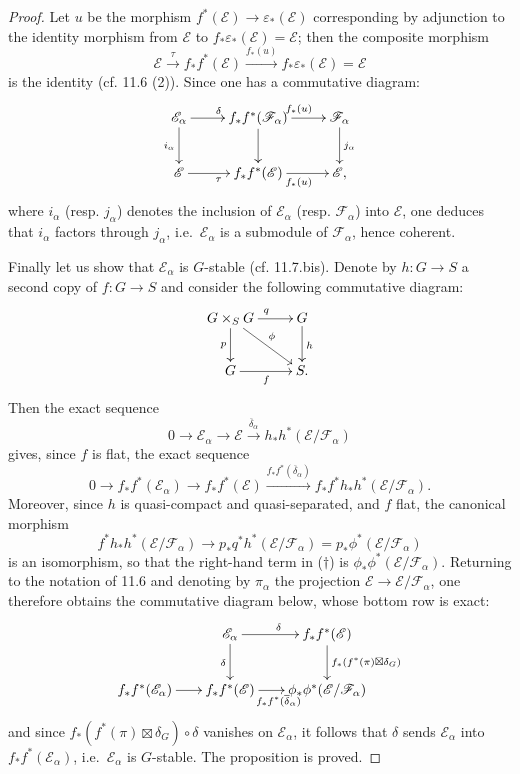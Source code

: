 \begin{proof}
Let $u$ be the morphism $f^*(\mathscr E)\to\varepsilon_*(\mathscr E)$ corresponding by adjunction to the identity morphism from $\mathscr E$ to $f_*\varepsilon_*(\mathscr E)=\mathscr E$; then the composite morphism
\[
\mathscr E\xrightarrow{\tau}f_*f^*(\mathscr E)\xrightarrow{f_*(u)}f_*\varepsilon_*(\mathscr E)=\mathscr E
\]
is the identity (cf. 11.6 (2)). Since one has a commutative diagram:
\[
\xymatrix{\mathscr E_\alpha\ar[r]^\delta\ar[d]_{i_\alpha}&f_*f^*(\mathscr F_\alpha)\ar[r]^{f_*(u)}\ar[d]&\mathscr F_\alpha\ar[d]^{j_\alpha}\\\mathscr E\ar[r]_\tau&f_*f^*(\mathscr E)\ar[r]_{f_*(u)}&\mathscr E,}
\]
where $i_\alpha$ (resp. $j_\alpha$) denotes the inclusion of $\mathscr E_\alpha$ (resp. $\mathscr F_\alpha$) into $\mathscr E$, one deduces that $i_\alpha$ factors through $j_\alpha$, i.e.\ $\mathscr E_\alpha$ is a submodule of $\mathscr F_\alpha$, hence coherent.

Finally let us show that $\mathscr E_\alpha$ is $G$-stable (cf. 11.7.bis). Denote by $h:G\to S$ a second copy of $f:G\to S$ and consider the following commutative diagram:
\[
\xymatrix{G\times_S G\ar[r]^q\ar[d]_p\ar[dr]^\phi&G\ar[d]^h\\G\ar[r]_f&S.}
\]
Then the exact sequence
\[
0\to\mathscr E_\alpha\to\mathscr E\xrightarrow{\overline\delta_\alpha}h_*h^*(\mathscr E/\mathscr F_\alpha)
\]
gives, since $f$ is flat, the exact sequence
\begin{equation*}\tag{$\dagger$}
0\to f_*f^*(\mathscr E_\alpha)\to f_*f^*(\mathscr E)\xrightarrow{f_*f^*(\overline\delta_\alpha)}f_*f^*h_*h^*(\mathscr E/\mathscr F_\alpha).
\end{equation*}
Moreover, since $h$ is quasi-compact and quasi-separated, and $f$ flat, the canonical morphism
\[
f^*h_*h^*(\mathscr E/\mathscr F_\alpha)\to p_*q^*h^*(\mathscr E/\mathscr F_\alpha)=p_*\phi^*(\mathscr E/\mathscr F_\alpha)
\]
is an isomorphism, so that the right-hand term in ($\dagger$) is $\phi_*\phi^*(\mathscr E/\mathscr F_\alpha)$. Returning to the notation of 11.6 and denoting by $\pi_\alpha$ the projection $\mathscr E\to\mathscr E/\mathscr F_\alpha$, one therefore obtains the commutative diagram below, whose bottom row is exact:
\[
\xymatrix@C=18pt{&\mathscr E_\alpha\ar[r]^\delta\ar[d]_\delta&f_*f^*(\mathscr E)\ar[d]^{f_*(f^*(\pi)\boxtimes\delta_G)}\\f_*f^*(\mathscr E_\alpha)\ar[r]&f_*f^*(\mathscr E)\ar[r]_{f_*f^*(\overline\delta_\alpha)}&\phi_*\phi^*(\mathscr E/\mathscr F_\alpha)}
\]
and since $f_*(f^*(\pi)\boxtimes\delta_G)\circ\delta$ vanishes on $\mathscr E_\alpha$, it follows that $\delta$ sends $\mathscr E_\alpha$ into $f_*f^*(\mathscr E_\alpha)$, i.e.\ $\mathscr E_\alpha$ is $G$-stable. The proposition is proved.
\end{proof}

